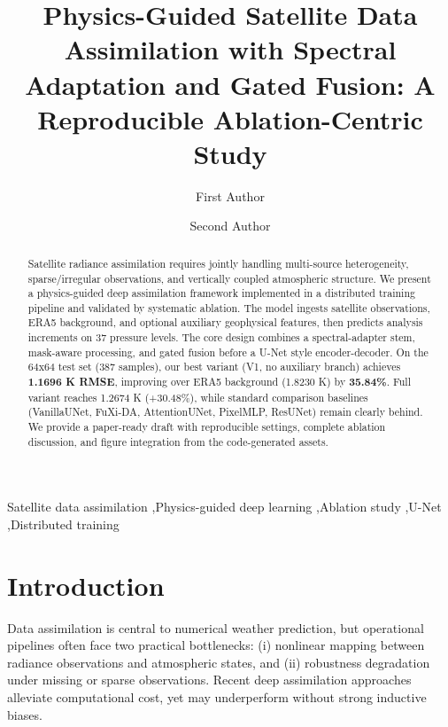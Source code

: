 \documentclass[preprint,12pt]{elsarticle}
\begin{document}
\begin{frontmatter}

\title{Physics-Guided Satellite Data Assimilation with Spectral Adaptation and Gated Fusion: A Reproducible Ablation-Centric Study}

\author{First Author}
\author{Second Author}
\address{School of XXX, University of XXX, City, Country}

\begin{abstract}
Satellite radiance assimilation requires jointly handling multi-source heterogeneity, sparse/irregular observations, and vertically coupled atmospheric structure. We present a physics-guided deep assimilation framework implemented in a distributed training pipeline and validated by systematic ablation. The model ingests satellite observations, ERA5 background, and optional auxiliary geophysical features, then predicts analysis increments on 37 pressure levels. The core design combines a spectral-adapter stem, mask-aware processing, and gated fusion before a U-Net style encoder-decoder. On the 64x64 test set (387 samples), our best variant (V1, no auxiliary branch) achieves \textbf{1.1696 K RMSE}, improving over ERA5 background (1.8230 K) by \textbf{35.84\%}. Full variant reaches 1.2674 K (+30.48\%), while standard comparison baselines (VanillaUNet, FuXi-DA, AttentionUNet, PixelMLP, ResUNet) remain clearly behind. We provide a paper-ready draft with reproducible settings, complete ablation discussion, and figure integration from the code-generated assets.
\end{abstract}

\begin{keyword}
Satellite data assimilation \sep Physics-guided deep learning \sep Ablation study \sep U-Net \sep Distributed training
\end{keyword}

\end{frontmatter}

\section{Introduction}
Data assimilation is central to numerical weather prediction, but operational pipelines often face two practical bottlenecks: (i) nonlinear mapping between radiance observations and atmospheric states, and (ii) robustness degradation under missing or sparse observations. Recent deep assimilation approaches alleviate computational cost, yet may underperform without strong inductive biases.
\end{document}

